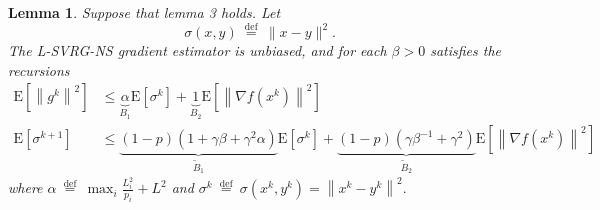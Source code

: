 \documentclass[8pt,a4paper]{article}
\newtheorem{lemma}{Lemma}
\begin{document}
	
	
	\begin{lemma}
		Suppose that lemma 3 holds. Let
		$$
		\sigma(x, y) \stackrel{\text { def }}{=}\|x-y\|^{2} .
		$$
		The L-SVRG-NS gradient estimator  is unbiased, and for each $\beta>0$ satisfies the recursions
		$$
		\begin{aligned}
			\mathrm{E}\left[\left\|g^{k}\right\|^{2}\right] & \leq \underbrace{\alpha}_{B_{1}} \mathrm{E}\left[\sigma^{k}\right]+\underbrace{1}_{B_{2}} \mathrm{E}\left[\left\|\nabla f\left(x^{k}\right)\right\|^{2}\right] \\
			\mathrm{E}\left[\sigma^{k+1}\right] & \leq \underbrace{(1-p)\left(1+\gamma \beta+\gamma^{2} \alpha\right)}_{\tilde{B}_{1}} \mathrm{E}\left[\sigma^{k}\right]+\underbrace{(1-p)\left(\gamma \beta^{-1}+\gamma^{2}\right)}_{\tilde{B}_{2}} \mathrm{E}\left[\left\|\nabla f\left(x^{k}\right)\right\|^{2}\right]
		\end{aligned}
		$$
		where $\alpha \stackrel{\text { def }}{=} \max_i\frac{L_i^2}{p_i}+L^2$ and $\sigma^{k} \stackrel{\text { def }}{=} \sigma\left(x^{k}, y^{k}\right)=\left\|x^{k}-y^{k}\right\|^{2} .$
	\end{lemma}
	
\end{document}
